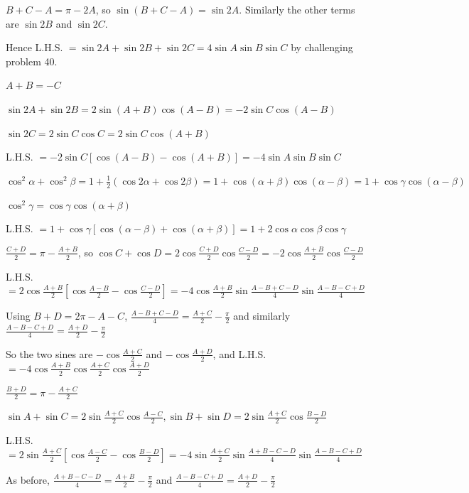 \item $B + C - A = \pi - 2A$, so $\sin(B + C - A) = \sin 2A$. Similarly the other terms are $\sin 2B$ and $\sin 2C$.

  Hence L.H.S. $= \sin 2A + \sin 2B + \sin 2C = 4\sin A\sin B\sin C$ by challenging problem 40.

\item $A + B = -C$

  $\sin 2A + \sin 2B = 2\sin(A + B)\cos(A - B) = -2\sin C\cos(A - B)$

  $\sin 2C = 2\sin C\cos C = 2\sin C\cos(A + B)$

  L.H.S. $= -2\sin C[\cos(A - B) - \cos(A + B)] = -4\sin A\sin B\sin C$

\item $\cos^2\alpha + \cos^2\beta = 1 + \frac{1}{2}(\cos 2\alpha + \cos 2\beta) = 1 + \cos(\alpha + \beta)\cos(\alpha - \beta)
  = 1 + \cos\gamma\cos(\alpha - \beta)$

  $\cos^2\gamma = \cos\gamma\cos(\alpha + \beta)$

  L.H.S. $= 1 + \cos\gamma[\cos(\alpha - \beta) + \cos(\alpha + \beta)] = 1 + 2\cos\alpha\cos\beta\cos\gamma$

\item $\frac{C + D}{2} = \pi - \frac{A + B}{2}$, so $\cos C + \cos D = 2\cos\frac{C + D}{2}\cos\frac{C - D}{2} = -2\cos\frac{A +
  B}{2}\cos\frac{C - D}{2}$

  L.H.S. $= 2\cos\frac{A + B}{2}\left[\cos\frac{A - B}{2} - \cos\frac{C - D}{2}\right] = -4\cos\frac{A + B}{2}\sin\frac{A - B +
  C - D}{4}\sin\frac{A - B - C + D}{4}$

  Using $B + D = 2\pi - A - C$, $\frac{A - B + C - D}{4} = \frac{A + C}{2} - \frac{\pi}{2}$ and similarly $\frac{A - B - C +
  D}{4} = \frac{A + D}{2} - \frac{\pi}{2}$

  So the two sines are $-\cos\frac{A + C}{2}$ and $-\cos\frac{A + D}{2}$, and L.H.S. $= -4\cos\frac{A + B}{2}\cos\frac{A +
  C}{2}\cos\frac{A + D}{2}$

\item $\frac{B + D}{2} = \pi - \frac{A + C}{2}$

  $\sin A + \sin C = 2\sin\frac{A + C}{2}\cos\frac{A - C}{2}, \sin B + \sin D = 2\sin\frac{A + C}{2}\cos\frac{B - D}{2}$

  L.H.S. $= 2\sin\frac{A + C}{2}\left[\cos\frac{A - C}{2} - \cos\frac{B - D}{2}\right] = -4\sin\frac{A + C}{2}\sin\frac{A + B -
  C - D}{4}\sin\frac{A - B - C + D}{4}$

  As before, $\frac{A + B - C - D}{4} = \frac{A + B}{2} - \frac{\pi}{2}$ and $\frac{A - B - C + D}{4} = \frac{A + D}{2} -
  \frac{\pi}{2}$


